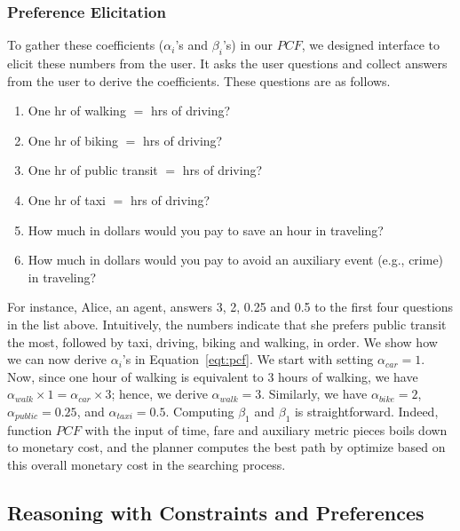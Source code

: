 \documentclass[letterpaper]{article}
\newcommand{\PCF}{\mathit{PCF}}
\newcommand{\walk}{\mathit{walk}}
\newcommand{\bike}{\mathit{bike}}
\newcommand{\car}{\mathit{car}}
\newcommand{\public}{\mathit{public}}
\newcommand{\taxi}{\mathit{taxi}}
\newcommand{\eqtref}[1]{Equation~\ref{eqt:#1}}
\begin{document}
\subsubsection{Preference Elicitation}
To gather these coefficients ($\alpha_i$'s and $\beta_i$'s) in our $\PCF$, we designed interface to
elicit these numbers from the user.
It asks the user questions and collect answers from the user to derive the coefficients.
These questions are as follows.
\begin{enumerate}
	\item One hr of walking $=$ \underline{\hspace{1cm}} hrs of driving?
	\item One hr of biking $=$ \underline{\hspace{1cm}} hrs of driving?
	\item One hr of public transit $=$ \underline{\hspace{1cm}} hrs of driving?
	\item One hr of taxi $=$ \underline{\hspace{1cm}} hrs of driving?
	\item How much in dollars would you pay to save an hour in traveling?
	\item How much in dollars would you pay to avoid an auxiliary event (e.g., crime) in traveling?
\end{enumerate}
For instance, Alice, an agent, answers 3, 2, 0.25 and 0.5 to the first four questions in the list above.
Intuitively, the numbers indicate that she prefers public transit the most, followed by
taxi, driving, biking and walking, in order.
We show how we can now derive $\alpha_i$'s in \eqtref{pcf}.
We start with setting $\alpha_\car=1$.
Now, since one hour of walking is equivalent to 3 hours of walking,
we have $\alpha_\walk \times 1 = \alpha_\car \times 3$;
hence, we derive $\alpha_\walk = 3$.
Similarly, we have $\alpha_\bike = 2$, $\alpha_\public = 0.25$,
and $\alpha_\taxi = 0.5$.
Computing $\beta_1$ and $\beta_1$ is straightforward.
Indeed, function $\PCF$ with the input of time, fare and
auxiliary metric pieces boils down to monetary cost,
and the planner computes the best path by optimize
based on this overall monetary cost in the searching
process.

\subsection{Reasoning with Constraints and Preferences}
\end{document}
